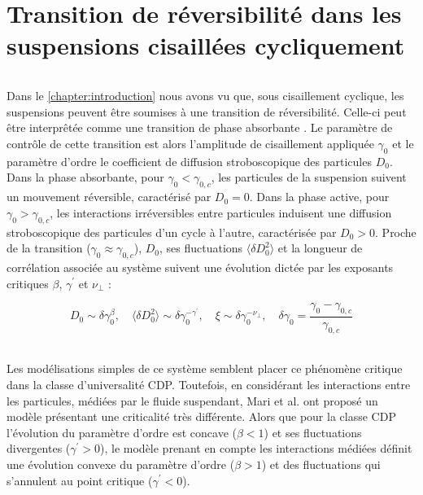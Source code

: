 \chapter{Transition de réversibilité dans les suspensions cisaillées cycliquement}

\label{chapter:Susp}

\subparagraph{}Dans le \autoref{chapter:introduction} nous avons vu que, sous cisaillement cyclique, les suspensions peuvent être soumises à une transition de réversibilité. Celle-ci peut être interprêtée comme une transition de phase absorbante \cite{pine_chaos_2005, corte_random_2008, tjhung_criticality_2016, ge_rheology_2022}. Le paramètre de contrôle de cette transition est alors l'amplitude de cisaillement appliquée $\gamma_0$ et le paramètre d'ordre le coefficient de diffusion stroboscopique des particules $D_0$. Dans la phase absorbante, pour $\gamma_0 < \gamma_{0,c}$, les particules de la suspension suivent un mouvement réversible, caractérisé par $D_0 = 0$. Dans la phase active, pour $\gamma_0 > \gamma_{0,c}$, les interactions irréversibles entre particules induisent une diffusion stroboscopique des particules d'un cycle à l'autre, caractérisée par $D_0 >0$. Proche de la transition ($\gamma_0\approx\gamma_{0,c}$), $D_0$, ses fluctuations $\langle \delta D_0^2 \rangle$ et la longueur de corrélation associée au système suivent une évolution dictée par les exposants critiques $\beta$, $\gamma^\prime$ et $\nu_\perp$ : 

\begin{equation}
	D_0 \sim \delta\gamma_0^\beta, \quad \langle \delta D_0^2 \rangle \sim \delta\gamma_0^{-\gamma^\prime},\quad \xi \sim \delta\gamma_0^{-\nu_\perp}, \quad \delta\gamma_0 = \frac{\gamma_0-\gamma_{0,c}}{\gamma_{0,c}}
\end{equation}

\subparagraph{}Les modélisations simples de ce système \cite{corte_random_2008, tjhung_criticality_2016, ge_rheology_2022} semblent placer ce phénomène critique dans la classe d'universalité CDP. Toutefois, en considérant les interactions entre les particules, médiées par le fluide suspendant, Mari et al. \cite{mari_absorbing_2022} ont proposé un modèle présentant une criticalité très différente. Alors que pour la classe CDP l'évolution du paramètre d'ordre est concave ($\beta < 1$) et ses fluctuations divergentes ($\gamma^\prime>0$), le modèle prenant en compte les interactions médiées définit une évolution convexe du paramètre d'ordre ($\beta >1$) et des fluctuations qui s'annulent au point critique ($\gamma^\prime < 0$).

